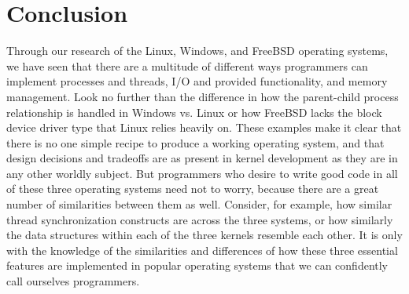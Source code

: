 \documentclass[letterpaper,10pt,titlepage]{article}
\begin{document}
\section{Conclusion}
Through our research of the Linux, Windows, and FreeBSD operating systems, we have seen that there are a multitude of different ways programmers can implement processes and threads, I/O and provided functionality, and memory management. Look no further than the difference in how the parent-child process relationship is handled in Windows vs. Linux or how FreeBSD lacks the block device driver type that Linux relies heavily on. These examples make it clear that there is no one simple recipe to produce a working operating system, and that design decisions and tradeoffs are as present in kernel development as they are in any other worldly subject. But programmers who desire to write good code in all of these three operating systems need not to worry, because there are a great number of similarities between them as well. Consider, for example, how similar thread synchronization constructs are across the three systems, or how similarly the data structures within each of the three kernels resemble each other. It is only with the knowledge of the similarities and differences of how these three essential features are implemented in popular operating systems that we can confidently call ourselves programmers.


\newpage
{}

\end{document}
